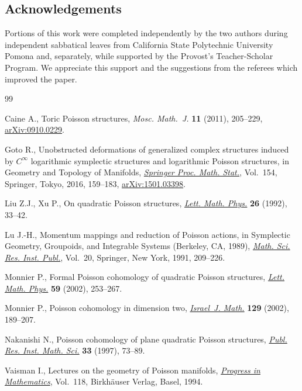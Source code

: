 \documentclass[pdftex]{sigma}
\numberwithin{equation}{section}
\begin{document}
\subsection*{Acknowledgements}

Portions of this work were completed independently by the two authors during independent sabbatical leaves from California State Polytechnic University Pomona and, separately, while supported by the Provost's Teacher-Scholar Program. We appreciate this support and the suggestions from the referees which improved the paper.

\begin{thebibliography}{99}
\footnotesize\itemsep=0pt

Caine A., Toric {P}oisson structures, \textit{Mosc. Math.~J.} \textbf{11}
 (2011), 205--229, \href{http://arxiv.org/abs/0910.0229}{arXiv:0910.0229}.

Goto R., Unobstructed deformations of generalized complex structures induced by
 {$C^\infty$} logarithmic symplectic structures and logarithmic {P}oisson
 structures, in Geometry and Topology of Manifolds, \href{https://doi.org/10.1007/978-4-431-56021-0_9}{\textit{Springer Proc.
 Math. Stat.}}, Vol.~154, Springer, Tokyo, 2016, 159--183, \href{http://arxiv.org/abs/1501.03398}{arXiv:1501.03398}.

Liu Z.J., Xu P., On quadratic {P}oisson structures, \href{https://doi.org/10.1007/BF00420516}{\textit{Lett. Math. Phys.}}
 \textbf{26} (1992), 33--42.

Lu J.-H., Momentum mappings and reduction of {P}oisson actions, in Symplectic
 Geometry, Groupoids, and Integrable Systems ({B}erkeley, {CA}, 1989),
 \href{https://doi.org/10.1007/978-1-4613-9719-9_15}{\textit{Math. Sci. Res. Inst. Publ.}}, Vol.~20, Springer, New York, 1991,
 209--226.

Monnier P., Formal {P}oisson cohomology of quadratic {P}oisson structures,
 \href{https://doi.org/10.1023/A:1015513632414}{\textit{Lett. Math. Phys.}} \textbf{59} (2002), 253--267.

Monnier P., Poisson cohomology in dimension two, \href{https://doi.org/10.1007/BF02773163}{\textit{Israel~J. Math.}}
 \textbf{129} (2002), 189--207.

Nakanishi N., Poisson cohomology of plane quadratic {P}oisson structures,
 \href{https://doi.org/10.2977/prims/1195145534}{\textit{Publ. Res. Inst. Math. Sci.}} \textbf{33} (1997), 73--89.

Vaisman I., Lectures on the geometry of {P}oisson manifolds, \href{https://doi.org/10.1007/978-3-0348-8495-2}{\textit{Progress
 in Mathematics}}, Vol.~118, Birkh\"auser Verlag, Basel, 1994.

\end{thebibliography}\LastPageEnding
\end{document}

